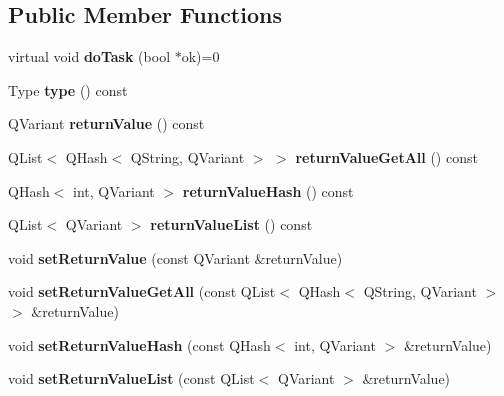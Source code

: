 \subsection*{Public Member Functions}
\begin{DoxyCompactItemize}
\item 
virtual void {\bfseries do\+Task} (bool $\ast$ok)=0\hypertarget{class_p_l_m_task_a3daa83d5290573d976b49bf41e969b72}{}\label{class_p_l_m_task_a3daa83d5290573d976b49bf41e969b72}

\item 
Type {\bfseries type} () const \hypertarget{class_p_l_m_task_adbcf19c6cd19a384154f0e57617d23b1}{}\label{class_p_l_m_task_adbcf19c6cd19a384154f0e57617d23b1}

\item 
Q\+Variant {\bfseries return\+Value} () const \hypertarget{class_p_l_m_task_a50be638d1d32a8ccf738e65c1d49f022}{}\label{class_p_l_m_task_a50be638d1d32a8ccf738e65c1d49f022}

\item 
Q\+List$<$ Q\+Hash$<$ Q\+String, Q\+Variant $>$ $>$ {\bfseries return\+Value\+Get\+All} () const \hypertarget{class_p_l_m_task_aa0421360e3640a07e4aa5a194082078f}{}\label{class_p_l_m_task_aa0421360e3640a07e4aa5a194082078f}

\item 
Q\+Hash$<$ int, Q\+Variant $>$ {\bfseries return\+Value\+Hash} () const \hypertarget{class_p_l_m_task_a99059e1a7ff7d2206f5a561fb05fbdd6}{}\label{class_p_l_m_task_a99059e1a7ff7d2206f5a561fb05fbdd6}

\item 
Q\+List$<$ Q\+Variant $>$ {\bfseries return\+Value\+List} () const \hypertarget{class_p_l_m_task_a58e455cbe80db6fdc6c4a2d920a342ff}{}\label{class_p_l_m_task_a58e455cbe80db6fdc6c4a2d920a342ff}

\item 
void {\bfseries set\+Return\+Value} (const Q\+Variant \&return\+Value)\hypertarget{class_p_l_m_task_a974b3db04ac20afc1a0dda65cd3afe1b}{}\label{class_p_l_m_task_a974b3db04ac20afc1a0dda65cd3afe1b}

\item 
void {\bfseries set\+Return\+Value\+Get\+All} (const Q\+List$<$ Q\+Hash$<$ Q\+String, Q\+Variant $>$ $>$ \&return\+Value)\hypertarget{class_p_l_m_task_ad4cdd4defb5b93c85360e2451837bd17}{}\label{class_p_l_m_task_ad4cdd4defb5b93c85360e2451837bd17}

\item 
void {\bfseries set\+Return\+Value\+Hash} (const Q\+Hash$<$ int, Q\+Variant $>$ \&return\+Value)\hypertarget{class_p_l_m_task_a8b0bca01fb1918f255d7a7a03aed5966}{}\label{class_p_l_m_task_a8b0bca01fb1918f255d7a7a03aed5966}

\item 
void {\bfseries set\+Return\+Value\+List} (const Q\+List$<$ Q\+Variant $>$ \&return\+Value)\hypertarget{class_p_l_m_task_a021bd4af36bcbffbf8673747b4ab22fe}{}\label{class_p_l_m_task_a021bd4af36bcbffbf8673747b4ab22fe}

\end{DoxyCompactItemize}
